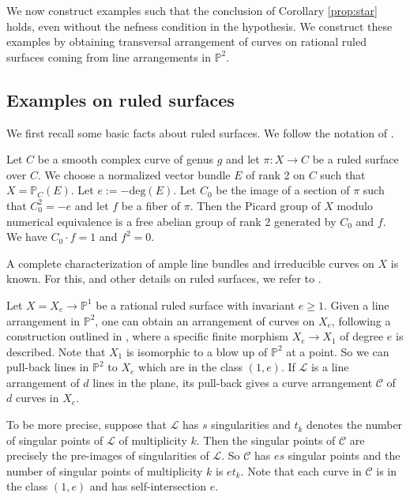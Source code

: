 \documentclass[12pt,reqno]{amsart}
\newcommand{\proj}{\mathbb{P}}
\theoremstyle{plain}
\numberwithin{equation}{section}
\theoremstyle{definition}
\begin{document}
	We now construct examples such that the conclusion of Corollary \ref{prop:star} holds, even without the nefness condition in the hypothesis. We construct these examples by obtaining transversal arrangement of curves on rational ruled surfaces coming from line arrangements in $\mathbb{P}^2.$ 

\subsection{Examples on ruled surfaces}\label{ruled}	
	
	We first recall some basic facts about ruled surfaces. We follow the notation of \cite[Chapter V, Section 2]{Har}.
	
	Let $C$ be a smooth complex curve of genus $g$ and let $\pi: X \to C$ be a ruled surface over $C$. We choose a normalized vector bundle $E$ of rank 2 on $C$ such that $X = \proj_C(E)$. Let $e :=-\text{deg}(E)$. Let $C_0$ be the image of a section of $\pi$ such that $C_0^2 = -e$ and let $f$ be a fiber of $\pi$. Then the Picard group of $X$ modulo numerical equivalence is a free abelian group of rank 2 generated by $C_0$ and $f$. We have $C_0\cdot f=1$ and $f^2 =0$.  
	
	A complete characterization of ample line bundles and irreducible curves on $X$ is known. For this, and other details on ruled surfaces, we refer to \cite[Chapter V, Section 2]{Har}.

	Let $X = X_e \to \mathbb{P}^1$ be a rational ruled surface with invariant $e \ge 1$. 
	Given a line arrangement in $\proj^2$, one can obtain an arrangement of
	curves on $X_e$, following a construction outlined in \cite[Example
	15]{E}, where a specific finite morphism $X_e \to X_1$ of degree $e$ is described. Note
	that $X_1$ is isomorphic to a blow up of $\proj^2$ at a point. So we
	can pull-back lines in $\proj^2$ to $X_e$ which are in the class 
	$(1,e)$. If $\mathcal{L}$ is a line arrangement of $d$ lines in the plane, its
	pull-back gives a curve arrangement $\mathcal{C}$ of $d$ curves in
	$X_e$. 
	
	To be more precise, suppose that $\mathcal{L}$ has $s$ singularities 
	and $t_k$ denotes the number of singular points of $\mathcal{L}$ of
	multiplicity $k$. Then the singular points of $\mathcal{C}$ are
	precisely the pre-images of singularities of $\mathcal{L}$. So 
	$\mathcal{C}$  has $es$ singular points and the
	number of singular points of multiplicity $k$ is $et_k$. Note that
	each curve in $\mathcal{C}$ is in the class $(1,e)$ and has
	self-intersection $e$.
	
\end{document}
